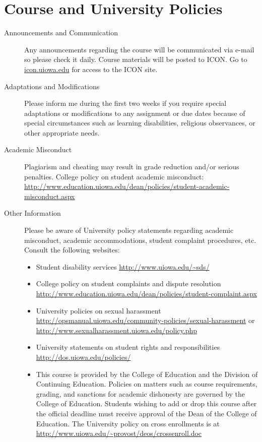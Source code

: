\documentclass[11pt,article,oneside]{memoir}
\begin{document}
\section*{Course and University Policies}
\begin{description}
\item[Announcements and Communication] %
Any announcements regarding the course will be communicated via e-mail so please check it daily. Course materials will be posted to ICON. Go to \href{http://icon.uiowa.edu}{icon.uiowa.edu} for access to the ICON site.
\item[Adaptations and Modifications] Please inform me during the first two weeks if you require special adaptations or modifications to any assignment or due dates because of special circumstances such as learning disabilities, religious observances, or other appropriate needs.
\item[Academic Misconduct] Plagiarism and cheating may result in grade reduction and/or serious penalties. College policy on student academic misconduct: \url{http://www.education.uiowa.edu/dean/policies/student-academic-misconduct.aspx}
\item[Other Information] Please be aware of University policy statements regarding academic misconduct, academic accommodations, student complaint procedures, etc.  Consult the following websites:
  \begin{itemize}
    \item Student disability services \url{http://www.uiowa.edu/~sds/}
    \item College policy on student complaints and dispute resolution \url{http://www.education.uiowa.edu/dean/policies/student-complaint.aspx}
    \item University policies on sexual harassment \url{http://opsmanual.uiowa.edu/community-policies/sexual-harassment} or \url{http://www.sexualharassment.uiowa.edu/policy.php}
    \item University statements on student rights and responsibilities \url{http://dos.uiowa.edu/policies/}
    \item This course is provided by the College of Education and the Division of Continuing Education.  Policies on matters such as course requirements, grading, and sanctions for academic dishonesty are governed by the College of Education. Students wishing to add or drop this course after the official deadline must receive approval of the Dean of the College of Education. The University policy on cross enrollments is at \url{http://www.uiowa.edu/~provost/deos/crossenroll.doc}
  \end{itemize}
\end{description}
\end{document}
